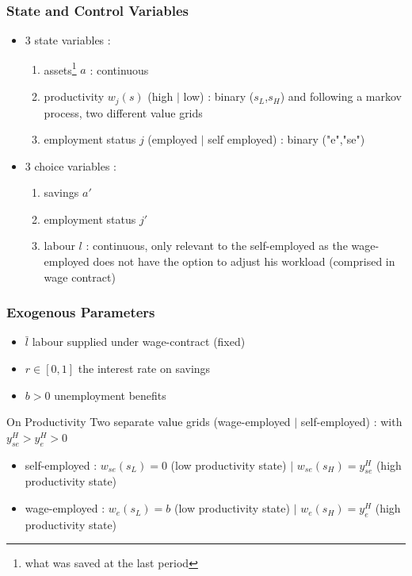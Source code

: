\documentclass{article}
\begin{document}
\subsubsection*{State and Control Variables}
\begin{itemize}
    \item 3 state variables : 
    \begin{enumerate}
        \item assets\footnote{what was saved at the last period} $a$ : continuous 
        \item productivity $w_j(s)$ (high $|$ low) : binary ($s_L$,$s_H$) and following a markov process, two different value grids
        \item employment status $j$ (employed $|$ self employed) : binary ("e","se")
    \end{enumerate}
    \item 3 choice variables : 
    \begin{enumerate}
        \item savings $a'$ 
        \item employment status $j'$ 
        \item labour $l$ : continuous, only relevant to the self-employed as the wage-employed does not have the option to adjust his workload (comprised in wage contract)
    \end{enumerate}
\end{itemize}

\subsubsection*{Exogenous Parameters}
\begin{itemize}
    \item $\bar{l}$ labour supplied under wage-contract (fixed)
    \item $r\in [0,1]$ the interest rate on savings 
    \item $b>0$ unemployment benefits 
\end{itemize}

\begin{simplebox}{On Productivity}
Two separate value grids (wage-employed $|$ self-employed) : with $y^H_{se} > y^H_{e}>0$
\begin{itemize}
    \item self-employed : $w_{se}(s_L)=0$ (low productivity state) $|$ $w_{se}(s_H)=y^H_{se}$ (high productivity state)
    \item wage-employed : $w_{e}(s_L) = b$ (low productivity state) $|$ $w_{e}(s_H)=y^H_{e}$ (high productivity state)
\end{itemize}
\end{simplebox}
\end{document}
